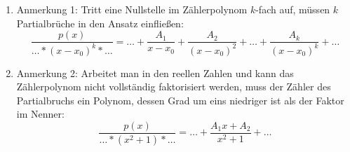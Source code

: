 \begin{enumerate}
    \item Anmerkung 1: Tritt eine Nullstelle im Zählerpolynom $k$-fach auf, müssen $k$ Partialbrüche in den Ansatz einfließen:
    $$
        \frac{p(x)}{\dots * (x-x_0)^k * \dots} = \dots + \frac{A_1}{x-x_0} + \frac{A_2}{(x-x_0)^2} + \dots + \frac{A_k}{(x-x_0)^k} + \dots
    $$
    \item Anmerkung 2: Arbeitet man in den reellen Zahlen und kann das Zählerpolynom nicht vollständig faktorisiert werden, muss der Zähler des Partialbruchs ein Polynom, dessen Grad um eins niedriger ist als der Faktor im Nenner:
    $$
        \frac{p(x)}{\dots * (x^2+1) * \dots} = \dots + \frac{A_1x+A_2}{x^2+1} + \dots
    $$
\end{enumerate}
